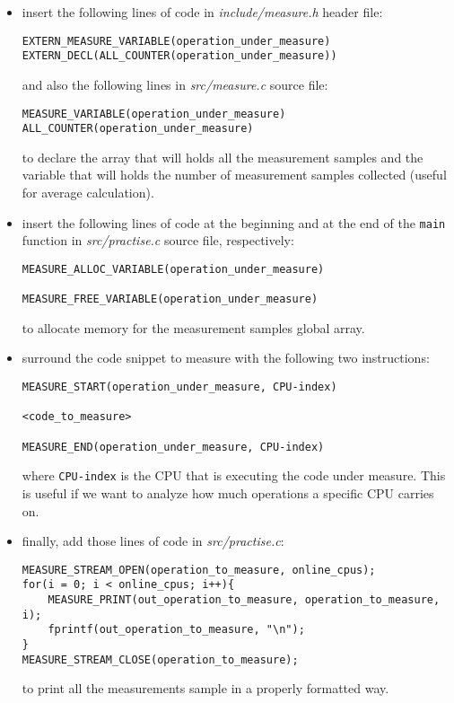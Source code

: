\begin{itemize}
\item insert the following lines of code in \emph{include/measure.h} header file:

\begin{lstlisting}
EXTERN_MEASURE_VARIABLE(operation_under_measure)
EXTERN_DECL(ALL_COUNTER(operation_under_measure))
\end{lstlisting}

and also the following lines in \emph{src/measure.c} source file:

\begin{lstlisting}
MEASURE_VARIABLE(operation_under_measure)
ALL_COUNTER(operation_under_measure)
\end{lstlisting}

to declare the array that will holds all the measurement samples and the variable that will 
holds the number of measurement samples collected (useful for average calculation).

\item insert the following lines of code at the beginning and at the end of the \texttt{main} 
function in \emph{src/practise.c} source file, respectively:

\begin{lstlisting}
MEASURE_ALLOC_VARIABLE(operation_under_measure)

MEASURE_FREE_VARIABLE(operation_under_measure)
\end{lstlisting}

to allocate memory for the measurement samples global array.

\item surround the code snippet to measure with the following two instructions:

\begin{lstlisting}
MEASURE_START(operation_under_measure, CPU-index)

<code_to_measure>

MEASURE_END(operation_under_measure, CPU-index)
\end{lstlisting}

where \texttt{CPU-index} is the CPU that is executing the code under measure. This is
useful if we want to analyze how much operations a specific CPU carries on.

\item finally, add those lines of code in \emph{src/practise.c}:

\begin{lstlisting}
MEASURE_STREAM_OPEN(operation_to_measure, online_cpus);
for(i = 0; i < online_cpus; i++){
	MEASURE_PRINT(out_operation_to_measure, operation_to_measure, i);
	fprintf(out_operation_to_measure, "\n");
}
MEASURE_STREAM_CLOSE(operation_to_measure);
\end{lstlisting}

to print all the measurements sample in a properly formatted way.

\end{itemize}

